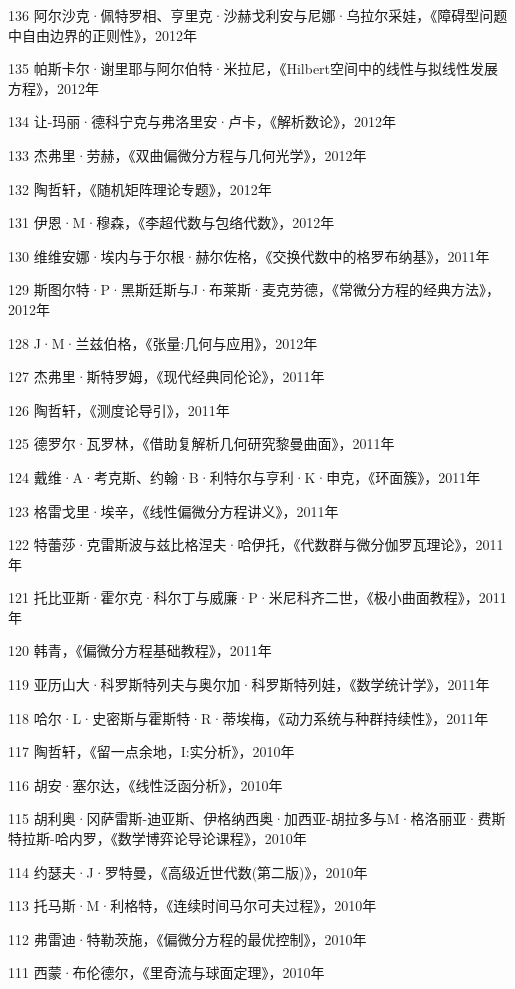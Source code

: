 \documentclass[10pt,b5paper,openany,twoside]{ctexbook}
\begin{document}
136 阿尔沙克·佩特罗相、亨里克·沙赫戈利安与尼娜·乌拉尔采娃，《障碍型问题中自由边界的正则性》，2012年

135 帕斯卡尔·谢里耶与阿尔伯特·米拉尼，《Hilbert空间中的线性与拟线性发展方程》，2012年

134 让-玛丽·德科宁克与弗洛里安·卢卡，《解析数论》，2012年

133 杰弗里·劳赫，《双曲偏微分方程与几何光学》，2012年

132 陶哲轩，《随机矩阵理论专题》，2012年

131 伊恩·M·穆森，《李超代数与包络代数》，2012年

130 维维安娜·埃内与于尔根·赫尔佐格，《交换代数中的格罗布纳基》，2011年

129 斯图尔特·P·黑斯廷斯与J·布莱斯·麦克劳德，《常微分方程的经典方法》，2012年

128 J·M·兰兹伯格，《张量:几何与应用》，2012年

127 杰弗里·斯特罗姆，《现代经典同伦论》，2011年

126 陶哲轩，《测度论导引》，2011年

125 德罗尔·瓦罗林，《借助复解析几何研究黎曼曲面》，2011年

124 戴维·A·考克斯、约翰·B·利特尔与亨利·K·申克，《环面簇》，2011年

123 格雷戈里·埃辛，《线性偏微分方程讲义》，2011年

122 特蕾莎·克雷斯波与兹比格涅夫·哈伊托，《代数群与微分伽罗瓦理论》，2011年

121 托比亚斯·霍尔克·科尔丁与威廉·P·米尼科齐二世，《极小曲面教程》，2011年

120 韩青，《偏微分方程基础教程》，2011年

119 亚历山大·科罗斯特列夫与奥尔加·科罗斯特列娃，《数学统计学》，2011年

118 哈尔·L·史密斯与霍斯特·R·蒂埃梅，《动力系统与种群持续性》，2011年

117 陶哲轩，《留一点余地，I:实分析》，2010年

116 胡安·塞尔达，《线性泛函分析》，2010年

115 胡利奥·冈萨雷斯-迪亚斯、伊格纳西奥·加西亚-胡拉多与M·格洛丽亚·费斯特拉斯-哈内罗，《数学博弈论导论课程》，2010年

114 约瑟夫·J·罗特曼，《高级近世代数(第二版)》，2010年

113 托马斯·M·利格特，《连续时间马尔可夫过程》，2010年

112 弗雷迪·特勒茨施，《偏微分方程的最优控制》，2010年

111 西蒙·布伦德尔，《里奇流与球面定理》，2010年
\end{document}
